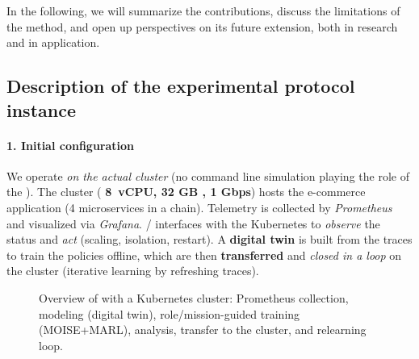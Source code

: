 \vspace{1em}

\noindent
In the following, we will summarize the contributions, discuss the limitations of the method, and open up perspectives on its future extension, both in research and in application.




\subsection{Description of the experimental protocol instance}

\paragraph{1. Initial configuration}

We operate \emph{on the actual cluster} (no command line simulation playing the role of the ). The cluster (\textbf{ 8~vCPU, 32 GB , 1 Gbps}) hosts the e-commerce application (4 microservices in a chain). Telemetry is collected by \textit{Prometheus} and visualized via \textit{Grafana}. / interfaces with the Kubernetes  to \textit {observe} the status and \textit{act} (scaling, isolation, restart). A \textbf{digital twin} is built from the traces to train the policies offline, which are then \textbf{transferred} and \textit{closed in a loop} on the cluster (iterative learning by refreshing traces).

\begin{figure}[h!]
  \centering
  \resizebox{\textwidth}{!}{%
    
  }
  \caption[Overall diagram of ] {Overview of  with a Kubernetes cluster: Prometheus collection, modeling (digital twin), role/mission-guided training (MOISE+MARL), analysis, transfer to the cluster, and relearning loop.}
  \label {fig:karma_architecture}
\end{figure}

